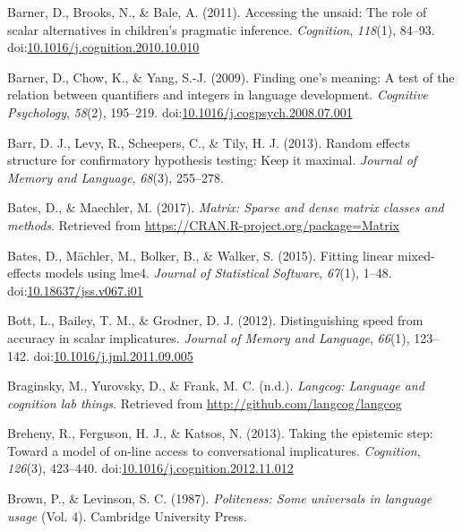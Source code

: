 \documentclass[man]{apa6}
\begin{document}
\hypertarget{ref-barner2011}{}
Barner, D., Brooks, N., \& Bale, A. (2011). Accessing the unsaid: The
role of scalar alternatives in children's pragmatic inference.
\emph{Cognition}, \emph{118}(1), 84--93.
doi:\href{https://doi.org/10.1016/j.cognition.2010.10.010}{10.1016/j.cognition.2010.10.010}

\hypertarget{ref-barner2009}{}
Barner, D., Chow, K., \& Yang, S.-J. (2009). Finding one's meaning: A
test of the relation between quantifiers and integers in language
development. \emph{Cognitive Psychology}, \emph{58}(2), 195--219.
doi:\href{https://doi.org/10.1016/j.cogpsych.2008.07.001}{10.1016/j.cogpsych.2008.07.001}

\hypertarget{ref-barr2013random}{}
Barr, D. J., Levy, R., Scheepers, C., \& Tily, H. J. (2013). Random
effects structure for confirmatory hypothesis testing: Keep it maximal.
\emph{Journal of Memory and Language}, \emph{68}(3), 255--278.

\hypertarget{ref-R-Matrix}{}
Bates, D., \& Maechler, M. (2017). \emph{Matrix: Sparse and dense matrix
classes and methods}. Retrieved from
\url{https://CRAN.R-project.org/package=Matrix}

\hypertarget{ref-R-lme4}{}
Bates, D., Mächler, M., Bolker, B., \& Walker, S. (2015). Fitting linear
mixed-effects models using lme4. \emph{Journal of Statistical Software},
\emph{67}(1), 1--48.
doi:\href{https://doi.org/10.18637/jss.v067.i01}{10.18637/jss.v067.i01}

\hypertarget{ref-bott2012}{}
Bott, L., Bailey, T. M., \& Grodner, D. J. (2012). Distinguishing speed
from accuracy in scalar implicatures. \emph{Journal of Memory and
Language}, \emph{66}(1), 123--142.
doi:\href{https://doi.org/10.1016/j.jml.2011.09.005}{10.1016/j.jml.2011.09.005}

\hypertarget{ref-R-langcog}{}
Braginsky, M., Yurovsky, D., \& Frank, M. C. (n.d.). \emph{Langcog:
Language and cognition lab things}. Retrieved from
\url{http://github.com/langcog/langcog}

\hypertarget{ref-breheny2013}{}
Breheny, R., Ferguson, H. J., \& Katsos, N. (2013). Taking the epistemic
step: Toward a model of on-line access to conversational implicatures.
\emph{Cognition}, \emph{126}(3), 423--440.
doi:\href{https://doi.org/10.1016/j.cognition.2012.11.012}{10.1016/j.cognition.2012.11.012}

\hypertarget{ref-brown1987}{}
Brown, P., \& Levinson, S. C. (1987). \emph{Politeness: Some universals
in language usage} (Vol. 4). Cambridge University Press.
\end{document}
